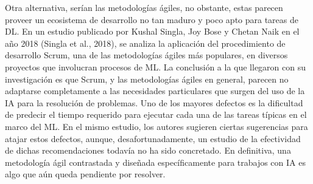 Otra alternativa, serían las metodologías ágiles, no obstante, estas parecen proveer un ecosistema de desarrollo no tan maduro y poco apto para tareas de DL. En un estudio publicado por Kushal Singla, Joy Bose y Chetan Naik en el año 2018 (Singla et al., 2018), se analiza la aplicación del procedimiento de desarrollo Scrum, una de las metodologías ágiles más populares, en diversos proyectos que involucran procesos de ML. La conclusión a la que llegaron con su investigación es que Scrum, y las metodologías ágiles en general, parecen no adaptarse completamente a las necesidades particulares que surgen del uso de la IA para la resolución de problemas. Uno de los mayores defectos es la dificultad de predecir el tiempo requerido para ejecutar cada una de las tareas típicas en el marco del ML. En el mismo estudio, los autores sugieren ciertas sugerencias para atajar estos defectos, aunque, desafortunadamente, un estudio de la efectividad de dichas recomendaciones todavía no ha sido concretado. En definitiva, una metodología ágil contrastada y diseñada específicamente para trabajos con IA es algo que aún queda pendiente por resolver.



